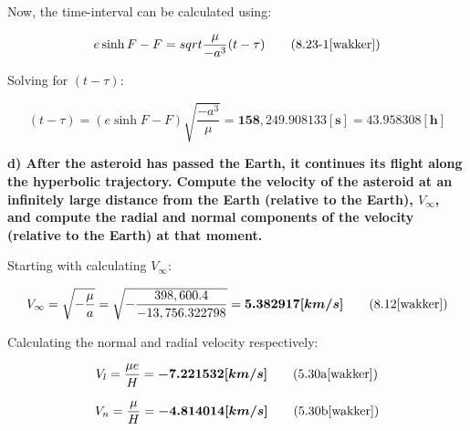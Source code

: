 \noindent Now, the time-interval can be calculated using:

\begin{equation}
    e \sinh{F} - F = sqrt{ \frac{\mu}{-a^3} } (t - \tau) 
    \tag{8.23-1\cite{wakker}}
    \label{eq:q3_a14}
\end{equation}

\noindent Solving for $(t - \tau)$:

\begin{equation}
    (t - \tau) = (e \sinh{F} - F) \sqrt{ \frac{-a^3}{\mu} } = \boldsymbol{158,249.908133 [s] = 43.958308 [h]}
    \label{eq:q3_a15}
\end{equation}










\noindent \textbf{d) After the asteroid has passed the Earth, it continues its flight along the hyperbolic trajectory. Compute the velocity of the asteroid at an infinitely large distance from the Earth (relative to the Earth), $V_{\infty}$, and compute the radial and normal components of the velocity (relative to the Earth) at that moment.}

\bigskip

\noindent Starting with calculating $V_{\infty}$:

\begin{equation}
    V_{\infty} = \sqrt{- \frac{\mu}{a}} = \sqrt{- \frac{398,600.4}{-13,756.322798}} = \boldsymbol{5.382917 [km/s]}
    \tag{8.12\cite{wakker}}
    \label{eq:q3_a16}
\end{equation}

\noindent Calculating the normal and radial velocity respectively:

\begin{equation}
    V_{l} = \frac{\mu e}{H} = \boldsymbol{-7.221532 [km/s]}
    \tag{5.30a\cite{wakker}}
    \label{eq:q3_a17}
\end{equation}

\begin{equation}
    V_{n} = \frac{\mu}{H} = \boldsymbol{-4.814014 [km/s]}
    \tag{5.30b\cite{wakker}}
    \label{eq:q3_a18}
\end{equation}

